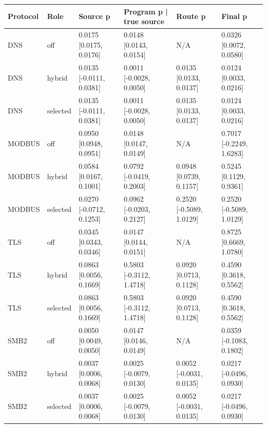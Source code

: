 \begin{tabular}{llllll}
\hline
Protocol & Role & Source p & Program p | true source & Route p & Final p \\
\hline
DNS & off & 0.0175 [0.0175, 0.0176] & 0.0148 [0.0143, 0.0154] & N/A & 0.0326 [0.0072, 0.0580] \\
DNS & hybrid & 0.0135 [-0.0111, 0.0381] & 0.0011 [-0.0028, 0.0050] & 0.0135 [0.0133, 0.0137] & 0.0124 [0.0033, 0.0216] \\
DNS & selected & 0.0135 [-0.0111, 0.0381] & 0.0011 [-0.0028, 0.0050] & 0.0135 [0.0133, 0.0137] & 0.0124 [0.0033, 0.0216] \\
MODBUS & off & 0.0950 [0.0948, 0.0951] & 0.0148 [0.0147, 0.0149] & N/A & 0.7017 [-0.2249, 1.6283] \\
MODBUS & hybrid & 0.0584 [0.0167, 0.1001] & 0.0792 [-0.0419, 0.2003] & 0.0948 [0.0739, 0.1157] & 0.5245 [0.1129, 0.9361] \\
MODBUS & selected & 0.0270 [-0.0712, 0.1253] & 0.0962 [-0.0203, 0.2127] & 0.2520 [-0.5089, 1.0129] & 0.2520 [-0.5089, 1.0129] \\
TLS & off & 0.0345 [0.0343, 0.0346] & 0.0147 [0.0144, 0.0151] & N/A & 0.8725 [0.6669, 1.0780] \\
TLS & hybrid & 0.0863 [0.0056, 0.1669] & 0.5803 [-0.3112, 1.4718] & 0.0920 [0.0713, 0.1128] & 0.4590 [0.3618, 0.5562] \\
TLS & selected & 0.0863 [0.0056, 0.1669] & 0.5803 [-0.3112, 1.4718] & 0.0920 [0.0713, 0.1128] & 0.4590 [0.3618, 0.5562] \\
SMB2 & off & 0.0050 [0.0049, 0.0050] & 0.0147 [0.0146, 0.0149] & N/A & 0.0359 [-0.1083, 0.1802] \\
SMB2 & hybrid & 0.0037 [0.0006, 0.0068] & 0.0025 [-0.0079, 0.0130] & 0.0052 [-0.0031, 0.0135] & 0.0217 [-0.0496, 0.0930] \\
SMB2 & selected & 0.0037 [0.0006, 0.0068] & 0.0025 [-0.0079, 0.0130] & 0.0052 [-0.0031, 0.0135] & 0.0217 [-0.0496, 0.0930] \\
\hline
\end{tabular}
